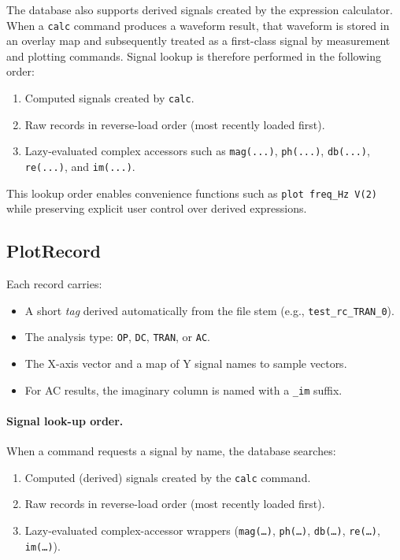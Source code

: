 The database also supports derived signals created by the expression calculator. When a \texttt{calc} command produces a waveform result, that waveform is stored in an overlay map and subsequently treated as a first-class signal by measurement and plotting commands. Signal lookup is therefore performed in the following order:
\begin{enumerate}
  \item Computed signals created by \texttt{calc}.
  \item Raw records in reverse-load order (most recently loaded first).
  \item Lazy-evaluated complex accessors such as \texttt{mag(...)}, \texttt{ph(...)}, \texttt{db(...)}, \texttt{re(...)}, and \texttt{im(...)}.
\end{enumerate}
This lookup order enables convenience functions such as \texttt{plot freq\_Hz V(2)} while preserving explicit user control over derived expressions.

\subsection{PlotRecord}
\label{subsec:plotrecord}
Each record carries:
\begin{itemize}
  \item A short \emph{tag} derived automatically from the file stem (e.g., \texttt{test\_rc\_TRAN\_0}).
  \item The analysis type: \texttt{OP}, \texttt{DC}, \texttt{TRAN}, or \texttt{AC}.
  \item The X-axis vector and a map of Y signal names to sample vectors.
  \item For AC results, the imaginary column is named with a \texttt{\_im} suffix.
\end{itemize}

\paragraph{Signal look-up order.}
When a command requests a signal by name, the database searches:
\begin{enumerate}
  \item Computed (derived) signals created by the \texttt{calc} command.
  \item Raw records in reverse-load order (most recently loaded first).
  \item Lazy-evaluated complex-accessor wrappers (\texttt{mag(\ldots)}, \texttt{ph(\ldots)}, \texttt{db(\ldots)}, \texttt{re(\ldots)}, \texttt{im(\ldots)}).
\end{enumerate}

